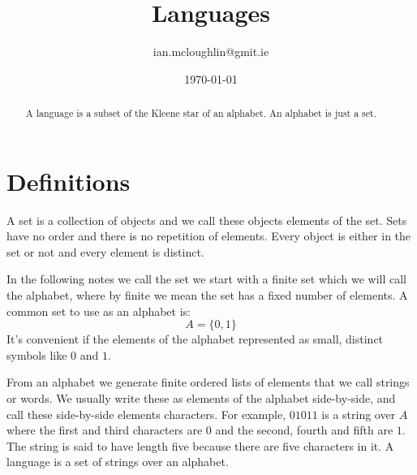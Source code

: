 

\title{Languages}
\author{ian.mcloughlin@gmit.ie}
\date{\today}



\maketitle

\begin{abstract}
  A language is a subset of the Kleene star of an alphabet.
  An alphabet is just a set.
\end{abstract}

\section{Definitions}
  A set is a collection of objects and we call these objects elements of the set.
  Sets have no order and there is no repetition of elements.
  Every object is either in the set or not and every element is distinct.
 
  In the following notes we call the set we start with a finite set which we will call the alphabet, where by finite we mean the set has a fixed number of elements.
  A common set to use as an alphabet is:
  \[ A = \{ 0, 1 \} \]
  It's convenient if the elements of the alphabet represented as small, distinct symbols like \( 0 \) and \( 1 \).

  From an alphabet we generate finite ordered lists of elements that we call strings or words.
  We usually write these as elements of the alphabet side-by-side, and call these side-by-side elements characters.
  For example, \( 01011 \) is a string over \( A \) where the first and third characters are \( 0 \) and the second, fourth and fifth are \( 1 \).
  The string is said to have length five because there are five characters in it.
  A language is a set of strings over an alphabet.
   
